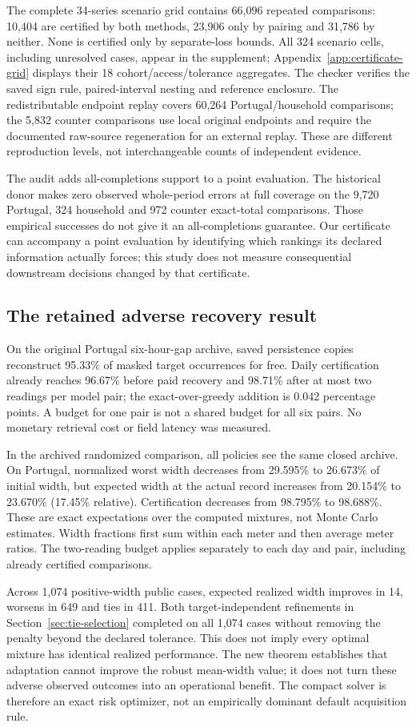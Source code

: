 The complete 34-series scenario grid contains 66,096 repeated comparisons:
10,404 are certified by both methods, 23,906 only by pairing and 31,786
by neither. None is certified only by separate-loss bounds. All 324
scenario cells, including unresolved cases, appear in the supplement;
Appendix~\ref{app:certificate-grid} displays their 18 cohort/access/tolerance
aggregates. The checker verifies the saved sign
rule, paired-interval nesting and reference enclosure. The redistributable
endpoint replay covers 60,264 Portugal/household comparisons; the 5,832
counter comparisons use local original endpoints and require the documented
raw-source regeneration for an external replay. These are different
reproduction levels, not interchangeable counts of independent evidence.

The audit adds all-completions support to a point evaluation. The historical
donor makes zero observed
whole-period errors at full coverage on the 9,720 Portugal, 324 household
and 972 counter exact-total comparisons. Those empirical successes do not
give it an all-completions guarantee. Our certificate can accompany a point
evaluation by identifying which rankings its declared information actually
forces; this study does not measure consequential downstream decisions
changed by that certificate.

\subsection{The retained adverse recovery result}
On the original Portugal six-hour-gap archive, saved persistence copies
reconstruct 95.33\% of masked target occurrences for free. Daily certification
already reaches 96.67\% before paid recovery and 98.71\% after at most two
readings per model pair; the exact-over-greedy addition is 0.042 percentage
points. A budget for one pair is not a shared budget for all six pairs.
No monetary retrieval cost or field latency was measured.

In the archived randomized comparison, all policies see the same closed
archive. On Portugal, normalized worst width decreases from 29.595\% to
26.673\% of initial width, but expected width at the actual record increases
from 20.154\% to 23.670\% (17.45\% relative). Certification decreases
from 98.795\% to 98.688\%. These are exact expectations over the computed
mixtures, not Monte Carlo estimates. Width fractions first sum within
each meter and then average meter ratios. The two-reading budget applies
separately to each day and pair, including already certified comparisons.

Across 1,074 positive-width public cases, expected realized width improves
in 14, worsens in 649 and ties in 411. Both target-independent refinements
in Section~\ref{sec:tie-selection} completed on all 1,074 cases without
removing the penalty beyond the declared tolerance. This does not imply
every optimal mixture has identical realized performance. The new theorem
establishes that adaptation cannot improve the robust mean-width value;
it does not turn these adverse observed outcomes into an operational benefit.
The compact solver is therefore an exact risk optimizer, not an empirically
dominant default acquisition rule.

